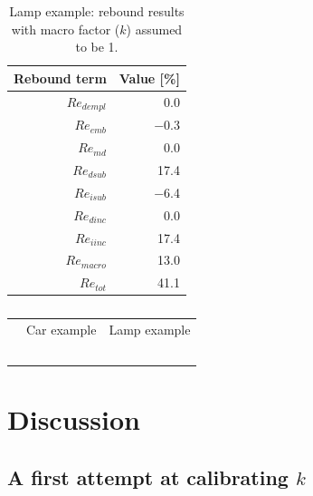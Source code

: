\documentclass[12pt]{article}\usepackage[]{graphicx}\usepackage[]{xcolor}
\begin{document}
\begin{table}[ht]
\centering
\caption{Lamp example: rebound results with macro factor ($k$) assumed to be 1.} 
\label{tab:lamp_results}
\begin{tabular}{rr}
  \toprule
Rebound term & Value [\%] \\ 
  \midrule
$Re_{dempl}$ & 0.0 \\ 
  $Re_{emb}$ & $-$0.3 \\ 
  $Re_{md}$ & 0.0 \\ 
  $Re_{dsub}$ & 17.4 \\ 
  $Re_{isub}$ & $-$6.4 \\ 
  $Re_{dinc}$ & 0.0 \\ 
  $Re_{iinc}$ & 17.4 \\ 
  $Re_{macro}$ & 13.0 \\ 
   \midrule
$Re_{tot}$ & 41.1 \\ 
   \bottomrule
\end{tabular}
\end{table}

\begin{table}
\footnotesize
\centering
\caption{ }
\label{tab:utility_model_comparison}
\begin{tabular}{r r r r r}
\toprule
            & \multicolumn{2}{c}{Car example}
                                      & \multicolumn{2}{c}{Lamp example} \\
     &  &           &  &            \\
\midrule
 & & & & \\
 & & & & \\
\midrule
 & & & & \\
\midrule
 & & & & \\
\bottomrule
\end{tabular}
\end{table}


\section{Discussion}
\label{sec:discussion}

\subsection{A first attempt at calibrating $k$}
\label{sec:calibrating_k}
\end{document}
